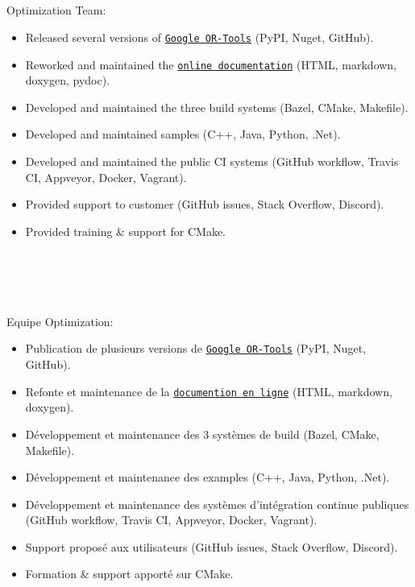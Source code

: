 \documentclass{resume}
\begin{document}
 {
   \\
   \\
   \\
   \\
  Optimization Team:\\
  \begin{itemize}
  	\item Released several versions of
      \href{https://github.com/google/or-tools}{\texttt{Google OR-Tools}} (PyPI, Nuget, GitHub).
  	\item Reworked and maintained the
      \href{https://developers.google.com/optimization/}{\texttt{online documentation}}
      (HTML, markdown, doxygen, pydoc).
  	\item Developed and maintained the three build systems (Bazel, CMake, Makefile).
  	\item Developed and maintained samples (C++, Java, Python, .Net).
  	\item Developed and maintained the public CI systems
      (GitHub workflow, Travis CI, Appveyor, Docker, Vagrant).
  	\item Provided support to customer (GitHub issues, Stack Overflow, Discord).
  	\item Provided training \& support for CMake.
  \end{itemize}
} {
   \\
   \\
   \\
   \\
  Equipe Optimization:\\
  \begin{itemize}
  	\item Publication de plusieurs versions de
  		\href{https://github.com/google/or-tools}{\texttt{Google OR-Tools}} (PyPI, Nuget, GitHub).
    \item Refonte et maintenance de la
      \href{https://developers.google.com/optimization/}{\texttt{documention en ligne}}
      (HTML, markdown, doxygen).
    \item D\'{e}veloppement et maintenance des 3 syst\`{e}mes de build (Bazel, CMake, Makefile).
    \item D\'{e}veloppement et maintenance des examples (C++, Java, Python, .Net).
    \item D\'{e}veloppement et maintenance des syst\`{e}mes d'int\'{e}gration continue publiques
      (GitHub workflow, Travis CI, Appveyor, Docker, Vagrant).
    \item Support propos\'{e} aux utilisateurs (GitHub issues, Stack Overflow, Discord).
    \item Formation \& support apport\'{e} sur CMake.
  \end{itemize}
}
\end{document}
